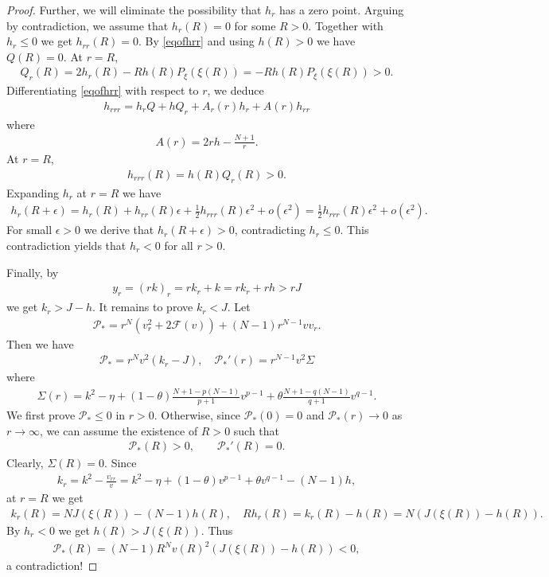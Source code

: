 \documentclass[10pt,a4paper]{amsart}
\newcommand{\ep}{\epsilon}
\newcommand{\p}{\mathcal{P}}
\begin{document}
\begin{proof}
		Further, we will eliminate the possibility that $h_r$ has a zero point. Arguing by contradiction, we assume that $h_r(R) = 0$ for some $R > 0$. Together with $h_r \le 0$ we get $h_{rr}(R) = 0$. By \eqref{eqofhrr} and using $h(R) > 0$ we have $Q(R) = 0$. At $r = R$,
		\begin{align*}
			Q_r(R) = 2h_r(R) - Rh(R)P_\xi(\xi(R)) = - Rh(R)P_\xi(\xi(R)) > 0.
		\end{align*}
		Differentiating \eqref{eqofhrr} with respect to $r$, we deduce
		\begin{align*}
			h_{rrr} = h_rQ + hQ_r + A_r(r)h_r + A(r)h_{rr}
		\end{align*}
		where
		\begin{align*}
			A(r) = 2rh - \frac{N+1}{r}.
		\end{align*}
		At $r = R$,
		\begin{align*}
			h_{rrr}(R) = h(R)Q_r(R) > 0.
		\end{align*}
		Expanding $h_r$ at $r = R$ we have
		\begin{align*}
			h_r(R + \ep) = h_r(R) + h_{rr}(R)\ep + \frac12 h_{rrr}(R)\ep^2 + o(\ep^2) = \frac12 h_{rrr}(R)\ep^2 + o(\ep^2).
		\end{align*}
		For small $\ep > 0$ we derive that $h_r(R + \ep) > 0$, contradicting $h_r \le 0$. This contradiction yields that $h_r < 0$ for all $r > 0$.

		Finally, by
		\begin{align*}
			y_r = (rk)_r = r k_r + k = rk_r + rh > rJ
		\end{align*}
		we get $k_r > J - h$. It remains to prove $k_r < J$. Let
		\begin{align*}
			\p_* = r^N\left(v_r^2 + 2\mathcal{F}(v)\right) + (N-1)r^{N-1}vv_r.
		\end{align*}
	    Then we have
		\begin{align*}
			\p_* = r^Nv^2 \left(k_r - J\right), \quad \p_*'(r) = r^{N-1}v^2 \Sigma
		\end{align*}
		where
		\begin{align*}
			\Sigma(r) = k^2 - \eta + (1-\theta)\frac{N+1-p(N-1)}{p+1}v^{p-1} + \theta\frac{N+1-q(N-1)}{q+1}v^{q-1}.
		\end{align*}
		We first prove $\p_* \le 0$ in $r > 0$. Otherwise, since $\p_*(0) = 0$ and $\p_*(r) \to 0$ as $r \to \infty$, we can assume the existence of $R > 0$ such that
		\begin{align*}
			\p_*(R) > 0, \quad\quad \p_*'(R) = 0.
		\end{align*}
		Clearly, $\Sigma(R)  = 0$. Since
		\begin{align*}
			k_r = k^2 - \frac{v_{rr}}{v} = k^2 - \eta + (1-\theta)v^{p-1} + \theta v^{q-1} - (N-1)h,
		\end{align*}
		at $r = R$ we get
		\begin{align*}
			k_r(R) = N J(\xi(R)) - (N-1)h(R), \quad Rh_r(R) = k_r(R) - h(R) = N\left(J(\xi(R)) - h(R)\right).
		\end{align*}
		By $h_r < 0$ we get $h(R) > J(\xi(R))$. Thus
		\begin{align*}
			\p_*(R) = (N-1)R^{N}v(R)^2\left(J(\xi(R)) - h(R)\right) < 0,
		\end{align*}
		a contradiction!


\end{proof}
\end{document}
